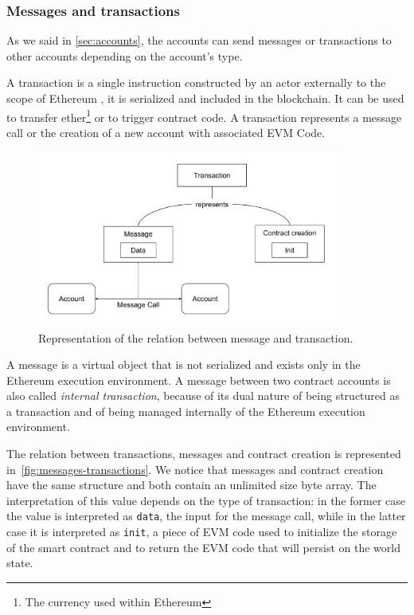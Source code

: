 \subsubsection{Messages and transactions}

As we said in \autoref{sec:accounts}, the accounts can send messages or
transactions to other accounts depending on the account's type.

A transaction is a single instruction constructed by an actor externally to the
scope of Ethereum \cite{wood2018ethereum}, it is serialized and included in the
blockchain. It can be used to transfer ether\footnote{The currency used within
Ethereum} or to trigger contract code. A transaction represents a message call
or the creation of a new account with associated EVM Code.

\begin{figure}[h]
  \centering
  \includegraphics[width=0.9\textwidth]{./res/img/messages-transactions.pdf}
\caption{Representation of the relation between message and transaction.}
\label{fig:messages-transactions}
\end{figure}

A message is a virtual object that is not serialized and exists only in the
Ethereum execution environment. A message between two contract accounts is also
called \emph{internal transaction}, because of its dual nature of being
structured as a transaction and of being managed internally of the Ethereum
execution environment.

The relation between transactions, messages and contract creation is 
represented in~\autoref{fig:messages-transactions}. We notice that messages and 
contract creation have the same structure and both contain an unlimited size 
byte array. The interpretation of this value depends on the type of transaction:
in the former case the value is interpreted as \verb+data+, the input for the
message call, while in the latter case it is interpreted as \verb|init|, a piece
of EVM code used to initialize the storage of the smart contract and to return
the EVM code that will persist on the world state.


